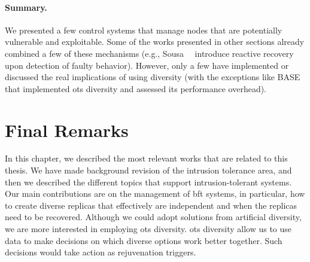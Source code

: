 \paragraph{Summary.}
We presented a few control systems that manage nodes that are potentially vulnerable and exploitable.
Some of the works presented in other sections already combined a few of these mechanisms (e.g., Sousa~\etal{}~\cite{Sousa:2010} introduce reactive recovery upon detection of faulty behavior). 
However, only a few have implemented or discussed the real implications of using diversity (with the exceptions like BASE~\cite{Castro:2003} that implemented \gls{ots} diversity and assessed its performance overhead).


\section{Final Remarks}
In this chapter, we described the most relevant works that are related to this thesis.
We have made background revision of the intrusion tolerance area, and then we described the different topics that support intrusion-tolerant systems.
Our main contributions are on the management of \gls{bft} systems, in particular, how to create diverse replicas that effectively are independent and when the replicas need to be recovered. 
Although we could adopt solutions from artificial diversity, we are more interested in employing \gls{ots} diversity.
\gls{ots} diversity allow us to use data to make decisions on which diverse options work better together.
Such decisions would take action as rejuvenation triggers. 




